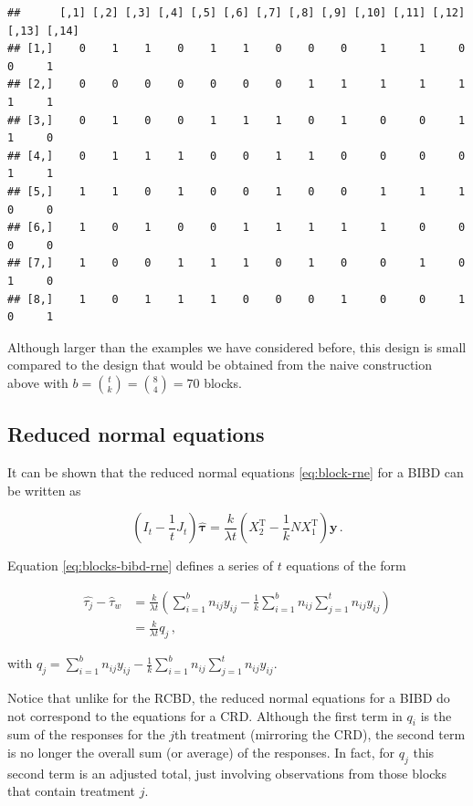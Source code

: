 \documentclass[
]{book}
\theoremstyle{definition}
\theoremstyle{definition}
\theoremstyle{definition}
\theoremstyle{definition}
\theoremstyle{remark}
\begin{document}
\begin{verbatim}
##      [,1] [,2] [,3] [,4] [,5] [,6] [,7] [,8] [,9] [,10] [,11] [,12] [,13] [,14]
## [1,]    0    1    1    0    1    1    0    0    0     1     1     0     0     1
## [2,]    0    0    0    0    0    0    0    1    1     1     1     1     1     1
## [3,]    0    1    0    0    1    1    1    0    1     0     0     1     1     0
## [4,]    0    1    1    1    0    0    1    1    0     0     0     0     1     1
## [5,]    1    1    0    1    0    0    1    0    0     1     1     1     0     0
## [6,]    1    0    1    0    0    1    1    1    1     1     0     0     0     0
## [7,]    1    0    0    1    1    1    0    1    0     0     1     0     1     0
## [8,]    1    0    1    1    1    0    0    0    1     0     0     1     0     1
\end{verbatim}

Although larger than the examples we have considered before, this design is small compared to the design that would be obtained from the naive construction above with \(b = {t \choose k} = {8 \choose 4} = 70\) blocks.

\hypertarget{reduced-normal-equations}{%
\subsection{Reduced normal equations}\label{reduced-normal-equations}}

It can be shown that the reduced normal equations \eqref{eq:block-rne} for a BIBD can be written as

\begin{equation}
\left(I_t - \frac{1}{t}J_t\right)\hat{\boldsymbol{\tau}} = \frac{k}{\lambda t}\left(X_2^{\mathrm{T}} - \frac{1}{k}NX_1^{\mathrm{T}}\right)\boldsymbol{y}\,.
\label{eq:blocks-bibd-rne}
\end{equation}

Equation \eqref{eq:blocks-bibd-rne} defines a series of \(t\) equations of the form

\begin{align*}
\hat{\tau_j} - \hat{\tau}_w & = \frac{k}{\lambda t}\left(\sum_{i = 1}^b n_{ij}y_{ij} - \frac{1}{k}\sum_{i=1}^bn_{ij}\sum_{j=1}^tn_{ij}y_{ij}\right) \\
& = \frac{k}{\lambda t} q_j\,,
\end{align*}

with \(q_j = \sum_{i = 1}^b n_{ij}y_{ij} - \frac{1}{k}\sum_{i=1}^bn_{ij}\sum_{j=1}^tn_{ij}y_{ij}\).

Notice that unlike for the RCBD, the reduced normal equations for a BIBD do not correspond to the equations for a CRD. Although the first term in \(q_i\) is the sum of the responses for the \(j\)th treatment (mirroring the CRD), the second term is no longer the overall sum (or average) of the responses. In fact, for \(q_j\) this second term is an adjusted total, just involving observations from those blocks that contain treatment \(j\).
\end{document}
